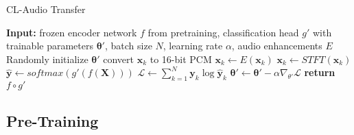\begin{algorithm}
    \caption{CL-Audio Transfer}
    \label{alg:claudio_transfer}
    
    \begin{algorithmic}[1]
        \State \textbf{Input:} frozen encoder network $f$ from pretraining, classification head $g'$ with trainable parameters $\boldsymbol{\theta'}$, batch size $N$, learning rate $\alpha$, audio enhancements $E$
        \State Randomly initialize $\boldsymbol{\theta'}$
                    \State convert $\boldsymbol{x}_k$ to 16-bit PCM
                    \State $\boldsymbol{x}_k \gets E(\boldsymbol{x}_k)$ 
                    \State $\boldsymbol{x}_k \gets STFT(\boldsymbol{x}_k)$
                \EndFor
                \State $\hat{\boldsymbol{y}} \gets softmax(g'(f(\boldsymbol{X})))$
                \State $\mathcal{L} \gets \sum_{k=1}^{N} \boldsymbol{y}_k \log \hat{\boldsymbol{y}}_k$ 
                \State $\boldsymbol{\theta'} \gets \boldsymbol{\theta'} - \alpha \nabla_{\theta'} \mathcal{L}$
            \EndFor
        \EndWhile
        \State \textbf{return} $f \circ g'$
    \end{algorithmic}
\end{algorithm}

\subsection{Pre-Training}

